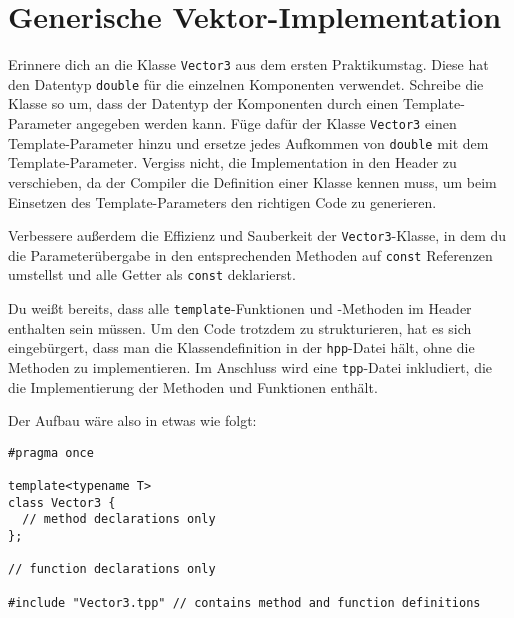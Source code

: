 \section{Generische Vektor-Implementation}
Erinnere dich an die Klasse \texttt{Vector3} aus dem ersten Praktikumstag. Diese hat den Datentyp \texttt{double} für die einzelnen Komponenten verwendet. Schreibe die Klasse so um, dass der Datentyp der Komponenten durch einen Template-Parameter angegeben werden kann.
Füge dafür der Klasse \texttt{Vector3} einen Template-Parameter hinzu und ersetze jedes Aufkommen von \texttt{double} mit dem Template-Parameter.
Vergiss nicht, die Implementation in den Header zu verschieben, da der Compiler die Definition einer Klasse kennen muss, um beim Einsetzen des Template-Parameters den richtigen Code zu generieren.

Verbessere außerdem die Effizienz und Sauberkeit der \texttt{Vector3}-Klasse, in dem du die Parameterübergabe in den entsprechenden Methoden auf \texttt{const} Referenzen umstellst und alle Getter als \texttt{const} deklarierst.

Du weißt bereits, dass alle \texttt{template}-Funktionen und -Methoden im Header enthalten sein müssen.
Um den Code trotzdem zu strukturieren, hat es sich eingebürgert, dass man die Klassendefinition in der \texttt{hpp}-Datei hält, ohne die Methoden zu implementieren.
Im Anschluss wird eine \texttt{tpp}-Datei inkludiert, die die Implementierung der Methoden und Funktionen enthält.
    
Der Aufbau wäre also in etwas wie folgt:
\begin{lstlisting}
#pragma once

template<typename T>
class Vector3 {
  // method declarations only
};

// function declarations only

#include "Vector3.tpp" // contains method and function definitions
\end{lstlisting}
